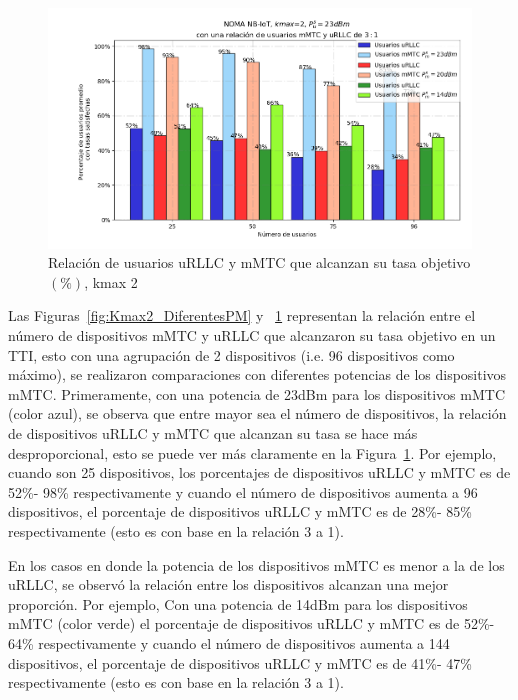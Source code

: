 \begin{figure}[th]
    \centering
    \includegraphics[scale=.6]{Figures/ResultadosNOMA/Kmax2_DiferentesPM_Porcentual.png}
    \decoRule
    \caption[Relación de usuarios uRLLC y mMTC que alcanzan su tasa objetivo $(\%)$, kmax 2]{Relación de usuarios uRLLC y mMTC que alcanzan su tasa objetivo$(\%)$, kmax 2}
    \label{fig:Kmax2_DiferentesPM_Porcentual}
\end{figure}

Las Figuras~\ref{fig:Kmax2_DiferentesPM} y ~\ref{fig:Kmax2_DiferentesPM_Porcentual} representan la relación entre el número de dispositivos mMTC y uRLLC que alcanzaron su tasa objetivo en un TTI, esto con una agrupación de 2 dispositivos (i.e. 96 dispositivos como máximo), se realizaron comparaciones con diferentes potencias de los dispositivos mMTC.\newline
Primeramente, con una potencia de 23dBm para los dispositivos mMTC (color azul), se observa que entre mayor sea el número de dispositivos, la relación de dispositivos uRLLC y mMTC que alcanzan su tasa se hace más desproporcional, esto se puede ver más claramente en la Figura~\ref{fig:Kmax2_DiferentesPM_Porcentual}. Por ejemplo, cuando son 25 dispositivos, los porcentajes de dispositivos uRLLC y mMTC es de 52\%- 98\% respectivamente y cuando el número de dispositivos aumenta a 96 dispositivos, el porcentaje de dispositivos uRLLC y mMTC es de 28\%- 85\% respectivamente (esto es con base en la relación 3 a 1). \newline

En los casos en donde la potencia de los dispositivos mMTC es menor a la de los uRLLC, se observó la relación entre los dispositivos alcanzan una mejor proporción. Por ejemplo, Con una potencia de 14dBm para los dispositivos mMTC (color verde) el porcentaje de dispositivos uRLLC y mMTC es de 52\%- 64\% respectivamente y cuando el número de dispositivos aumenta a 144 dispositivos, el porcentaje de dispositivos uRLLC y mMTC es de 41\%- 47\% respectivamente (esto es con base en la relación 3 a 1). \newline


